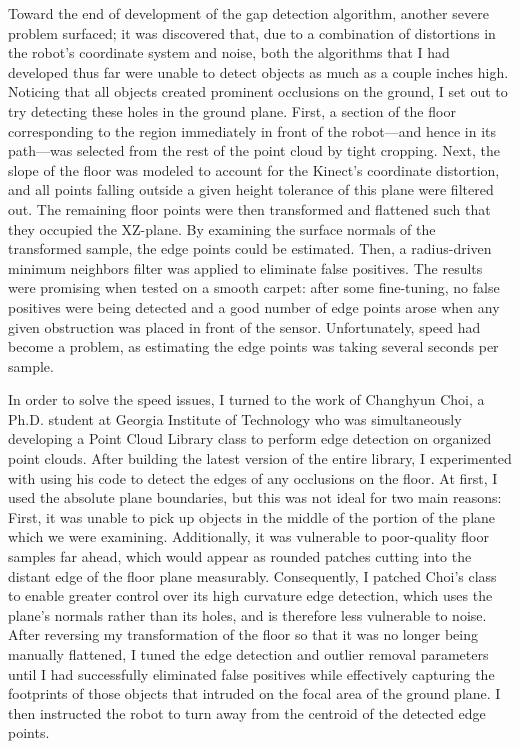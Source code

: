 \documentclass[12pt]{report}
\begin{document}
Toward the end of development of the gap detection algorithm, another severe problem surfaced; it was discovered that, due to a combination of distortions in the robot's coordinate system and noise, both the algorithms that I had developed thus far were unable to detect objects as much as a couple inches high.  Noticing that all objects created prominent occlusions on the ground, I set out to try detecting these holes in the ground plane.  First, a section of the floor corresponding to the region immediately in front of the robot---and hence in its path---was selected from the rest of the point cloud by tight cropping.  Next, the slope of the floor was modeled to account for the Kinect's coordinate distortion, and all points falling outside a given height tolerance of this plane were filtered out.  The remaining floor points were then transformed and flattened such that they occupied the XZ-plane.  By examining the surface normals of the transformed sample, the edge points could be estimated.  Then, a radius-driven minimum neighbors filter was applied to eliminate false positives.  The results were promising when tested on a smooth carpet: after some fine-tuning, no false positives were being detected and a good number of edge points arose when any given obstruction was placed in front of the sensor.  Unfortunately, speed had become a problem, as estimating the edge points was taking several seconds per sample.

In order to solve the speed issues, I turned to the work of Changhyun Choi, a Ph.D. student at Georgia Institute of Technology who was simultaneously developing a Point Cloud Library class to perform edge detection on organized point clouds.  After building the latest version of the entire library, I experimented with using his code to detect the edges of any occlusions on the floor.  At first, I used the absolute plane boundaries, but this was not ideal for two main reasons:  First, it was unable to pick up objects in the middle of the portion of the plane which we were examining.  Additionally, it was vulnerable to poor-quality floor samples far ahead, which would appear as rounded patches cutting into the distant edge of the floor plane measurably.  Consequently, I patched Choi's class to enable greater control over its high curvature edge detection, which uses the plane's normals rather than its holes, and is therefore less vulnerable to noise.  After reversing my transformation of the floor so that it was no longer being manually flattened, I tuned the edge detection and outlier removal parameters until I had successfully eliminated false positives while effectively capturing the footprints of those objects that intruded on the focal area of the ground plane.  I then instructed the robot to turn away from the centroid of the detected edge points.
\end{document}
